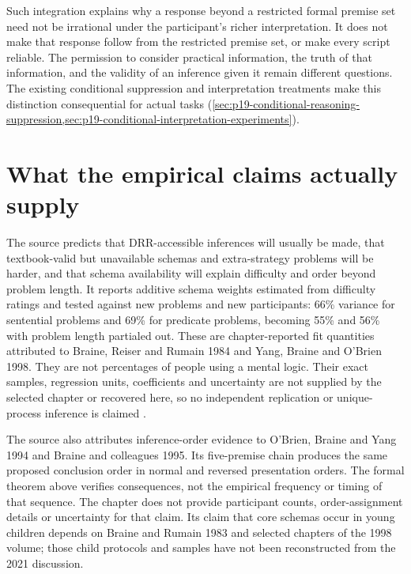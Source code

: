 Such integration explains why a response beyond a restricted formal
premise set need not be irrational under the participant's richer
interpretation. It does not make that response follow from the restricted
premise set, or make every script reliable. The permission to consider
practical information, the truth of that information, and the validity
of an inference given it remain different questions. The existing
conditional suppression and interpretation treatments make this
distinction consequential for actual tasks
(\cref{sec:p19-conditional-reasoning-suppression,sec:p19-conditional-interpretation-experiments}).

\section{What the empirical claims actually supply}
\label{sec:p19-r32-evidence}

The source predicts that DRR-accessible inferences will usually be made,
that textbook-valid but unavailable schemas and extra-strategy problems
will be harder, and that schema availability will explain difficulty
and order beyond problem length. It reports additive schema weights
estimated from difficulty ratings and tested against new problems and
new participants: 66\% variance for sentential problems and 69\% for
predicate problems, becoming 55\% and 56\% with problem length partialed
out. These are chapter-reported fit quantities attributed to Braine,
Reiser and Rumain 1984 and Yang, Braine and O'Brien 1998. They are not
percentages of people using a mental logic. Their exact samples,
regression units, coefficients and uncertainty are not supplied by the
selected chapter or recovered here, so no independent replication or
unique-process inference is claimed \cite[pp.~219--220]{OBrien2021NaturalLogic}.

The source also attributes inference-order evidence to O'Brien, Braine
and Yang 1994 and Braine and colleagues 1995. Its five-premise chain
produces the same proposed conclusion order in normal and reversed
presentation orders. The formal theorem above verifies consequences,
not the empirical frequency or timing of that sequence. The chapter
does not provide participant counts, order-assignment details or
uncertainty for that claim. Its claim that core schemas occur in young
children depends on Braine and Rumain 1983 and selected chapters of the
1998 volume; those child protocols and samples have not been reconstructed
from the 2021 discussion.

